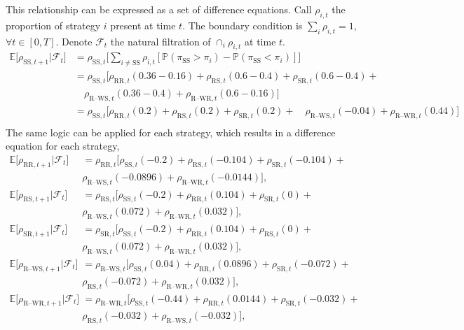 This relationship can be expressed as a set of difference equations. Call $\rho_{i,t}$ the proportion of strategy $i$ present at time $t$. The boundary condition is $\sum_i \rho_{i,t}= 1$, $\forall t \in [0,T]$. Denote $\mathcal F_t$ the natural filtration of $\cap_i \rho_{i,t}$ at time $t$.  \\
\begin{align*}
    \mathbb E \big [\rho_{\text{SS},t+1}| \mathcal F_t \big ] &= \rho_{\text{SS},t} \Bigg [\sum_{ i \neq \text{SS}}  \rho_{\text{i},t} [\mathbb P (\pi_\text{SS} > \pi_{i}) -\mathbb P (\pi_\text{SS} < \pi_{i}) ] \Bigg ] \\
    &= \rho_{\text{SS},t}\Bigg [\rho_{\text{RR}, t}(0.36-0.16) + \rho_{\text{RS}, t}(0.6-0.4) + \rho_{\text{SR}, t}(0.6-0.4) + \\
     & \quad \rho_{\text{R--WS}, t}(0.36-0.4) + \rho_{\text{R--WR}, t}(0.6-0.16) \Bigg ] \\
    &= \rho_{\text{SS},t}\Bigg [\rho_{\text{RR}, t}(0.2) + \rho_{\text{RS}, t}(0.2) + \rho_{\text{SR}, t}(0.2) + 
      \quad \rho_{\text{R--WS}, t}(-0.04) + \rho_{\text{R--WR}, t}(0.44) \Bigg ] \\
\end{align*}
The same logic can be applied for each strategy, which results in a difference equation for each strategy, \\
\begin{align*}
    \mathbb E \big [\rho_{\text{RR},t+1}| \mathcal F_t \big ] &=\rho_{\text{RR},t}\Bigg [\rho_{\text{SS}, t}(-0.2) + \rho_{\text{RS}, t}(-0.104) +  \rho_{\text{SR}, t}(-0.104) + \\ & \rho_{\text{R--WS}, t}(-0.0896) + \rho_{\text{R--WR}, t}(-0.0144) \Bigg ], \\
    \mathbb E \big [\rho_{\text{RS},t+1}| \mathcal F_t \big ] &=\rho_{\text{RS},t}\Bigg [\rho_{\text{SS}, t}(-0.2) + \rho_{\text{RR}, t}(0.104) +  \rho_{\text{SR}, t}(0) + \\ & \rho_{\text{R--WS}, t}(0.072) + \rho_{\text{R--WR}, t}(0.032) \Bigg ] ,\\
    \mathbb E \big [\rho_{\text{SR},t+1}| \mathcal F_t \big ] &=\rho_{\text{SR},t}\Bigg [\rho_{\text{SS}, t}(-0.2) + \rho_{\text{RR}, t}(0.104) +  \rho_{\text{RS}, t}(0) + \\ & \rho_{\text{R--WS}, t}(0.072) + \rho_{\text{R--WR}, t}(0.032) \Bigg ] ,\\
    \mathbb E \big [\rho_{\text{R--WS},t+1}| \mathcal F_t \big ] &=\rho_{\text{R--WS},t}\Bigg [\rho_{\text{SS}, t}(0.04) + \rho_{\text{RR}, t}(0.0896) +  \rho_{\text{SR}, t}(-0.072) + \\ & \rho_{\text{RS}, t}(-0.072) + \rho_{\text{R--WR}, t}(0.032) \Bigg ] , \\
\mathbb E \big [\rho_{\text{R--WR},t+1}| \mathcal F_t \big ] &=\rho_{\text{R--WR},t}\Bigg [\rho_{\text{SS}, t}(-0.44) + \rho_{\text{RR}, t}(0.0144) +  \rho_{\text{SR}, t}(-0.032) + \\ & \rho_{\text{RS}, t}(-0.032) +\rho_{\text{R--WS}, t}(-0.032)  \Bigg ] , \\    
\end{align*}

